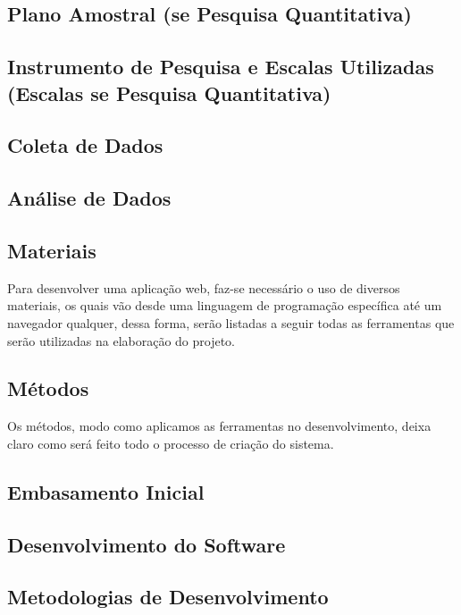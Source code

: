 \documentclass[
	article,			%
	12pt,				%
	oneside,			%
	a4paper,			%
	english,			%
	brazil,				%
	sumario=tradicional
	]{abntex2}
\begin{document}
\subsection{Plano Amostral (se Pesquisa Quantitativa)}
\lipsum[1]

\subsection{Instrumento de Pesquisa e Escalas Utilizadas (Escalas se Pesquisa Quantitativa)}
\lipsum[1]

\subsection{Coleta de Dados}
\lipsum[1]

\subsection{Análise de Dados}
\lipsum[1]

\subsection{Materiais}
Para desenvolver uma aplicação web, faz-se necessário o uso de diversos materiais, os quais vão desde uma linguagem de programação específica até um navegador qualquer, dessa forma, serão listadas a seguir todas as ferramentas que serão utilizadas na elaboração do projeto.
	
 \subsection{Métodos}
Os métodos, modo como aplicamos as ferramentas no desenvolvimento, deixa claro como será feito todo o processo de criação do sistema.

\subsection{Embasamento Inicial}
\lipsum[1]

\subsection{Desenvolvimento do Software}
\lipsum[1]

\subsection{Metodologias de Desenvolvimento}
\lipsum[1]
\end{document}

